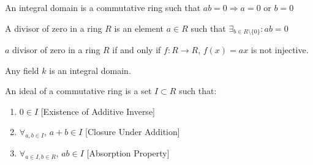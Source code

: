 \documentclass[crop=false,class=book,oneside]{standalone}
\begin{document}
\begin{definition}
An integral domain is a commutative ring such that $ab=0\Rightarrow a=0$ or $b=0$
\end{definition}
\begin{definition}
A divisor of zero in a ring $R$ is an element $a\in R$ such that $\exists_{b\in R\setminus\{0\}}:ab=0$
\end{definition}
\begin{theorem}
$a$ divisor of zero in a ring $R$ if and only if $f:R\rightarrow R$, $f(x) = ax$ is not injective.
\end{theorem}
\begin{theorem}
Any field $k$ is an integral domain.
\end{theorem}
\begin{definition}
An ideal of a commutative ring is a set $I\subset R$ such that:
\begin{enumerate}
    \item $0\in I$ \hfill [Existence of Additive Inverse]
    \item $\forall_{a,b\in I}$, $a+b\in I$ \hfill [Closure Under Addition]
    \item $\forall_{a\in I,b\in R}$, $a b \in I$ \hfill [Absorption Property]
\end{enumerate}
\end{definition}
\end{document}
